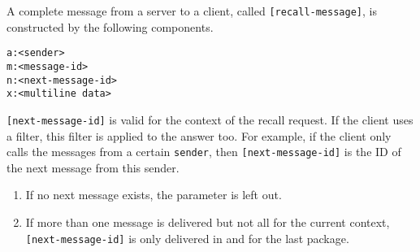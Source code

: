\documentclass[twoside,a4paper,english,12pt,authoryear,openright]{book}
\begin{document}
A complete message from a server to a client, called \texttt{[recall-message]}, is constructed by the following components.

\begin{lstlisting}
a:<sender>
m:<message-id>
n:<next-message-id>
x:<multiline data>
\end{lstlisting}

\texttt{[next-message-id]} is valid for the context of the recall request. If the client uses a filter, this filter is applied to the answer too. For example, if the client only calls the messages from a certain \texttt{sender}, then \texttt{[next-message-id]} is the ID of the next message from this sender.

\begin{enumerate}
\item{If no next message exists, the parameter is left out.}
\item{If more than one message is delivered but not all for the current context, \texttt{[next-message-id]} is only delivered in and for the last package.}
\end{enumerate}
\end{document}
